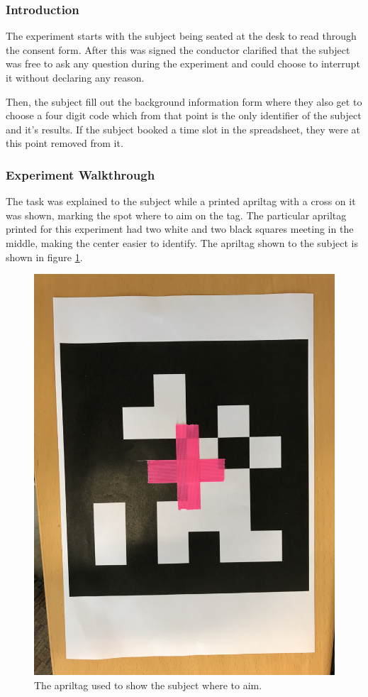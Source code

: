 \documentclass[nofilelist]{cslthse-msc}
\begin{document}
\subsubsection{Introduction}
The experiment starts with the subject being seated at the desk to read through the consent form. After this was signed the conductor clarified that the subject was free to ask any question during the experiment and could choose to interrupt it without declaring any reason. 

Then, the subject fill out the background information form where they also get to choose a four digit code which from that point is the only identifier of the subject and it's results. If the subject booked a time slot in the spreadsheet, they were at this point removed from it.

\subsubsection{Experiment Walkthrough}
The task was explained to the subject while a printed apriltag with a cross on it was shown, marking the spot where to aim on the tag. The particular apriltag printed for this experiment had two white and two black squares meeting in the middle, making the center easier to identify. The apriltag shown to the subject is shown in figure \ref{fig:apriltag}.

\begin{figure}[!hbt]
   \centering
   \includegraphics[scale=0.08]{images/apriltag.jpg} 
   \caption{The apriltag used to show the subject where to aim.}
   \label{fig:apriltag}
\end{figure}
\end{document}
